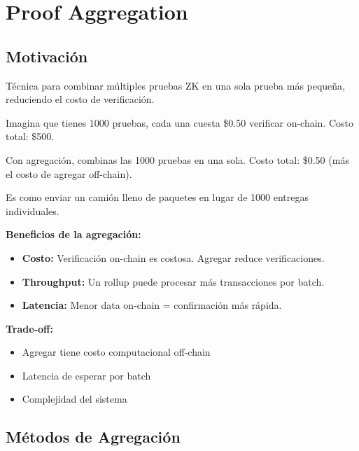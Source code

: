 \documentclass[11pt,a4paper,twoside]{book}
\begin{document}
\section{Proof Aggregation}
\label{sec:proof-aggregation}

\subsection{Motivaci\'on}

\begin{definition}
T\'ecnica para combinar m\'ultiples pruebas ZK en una sola prueba m\'as peque\~na, reduciendo el costo de verificaci\'on.
\end{definition}

\begin{intuicion}
Imagina que tienes 1000 pruebas, cada una cuesta \$0.50 verificar on-chain.
Costo total: \$500.

Con agregaci\'on, combinas las 1000 pruebas en una sola.
Costo total: \$0.50 (m\'as el costo de agregar off-chain).

Es como enviar un cami\'on lleno de paquetes en lugar de 1000 entregas individuales.
\end{intuicion}

\begin{keyidea}
\textbf{Beneficios de la agregaci\'on:}
\begin{itemize}
    \item \textbf{Costo:} Verificaci\'on on-chain es costosa. Agregar reduce verificaciones.
    \item \textbf{Throughput:} Un rollup puede procesar m\'as transacciones por batch.
    \item \textbf{Latencia:} Menor data on-chain = confirmaci\'on m\'as r\'apida.
\end{itemize}

\textbf{Trade-off:}
\begin{itemize}
    \item Agregar tiene costo computacional off-chain
    \item Latencia de esperar por batch
    \item Complejidad del sistema
\end{itemize}
\end{keyidea}

\subsection{M\'etodos de Agregaci\'on}
\end{document}
